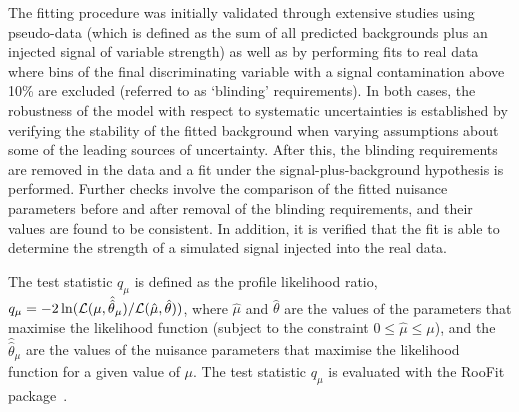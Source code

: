 The fitting procedure was initially validated through extensive studies using pseudo-data (which is defined as the sum of all predicted backgrounds 
plus an injected signal of variable strength) as well as by performing fits to real data where bins of the final discriminating variable with 
a signal contamination above 10\% are excluded (referred to as `blinding' requirements).
In both cases, the robustness of the model with respect to systematic uncertainties is established by verifying the stability of the fitted background 
when varying assumptions about some of the leading sources of uncertainty. 
After this, the blinding requirements
are removed in the data and a fit under the signal-plus-background hypothesis is performed. Further checks involve the comparison of the fitted 
nuisance parameters before and after removal of the blinding requirements, and their values are found to be consistent. In addition, it is verified that the 
fit is able to determine the strength of a simulated signal injected into the real data.

The test statistic $q_\mu$ is defined as the profile likelihood ratio, 
$q_\mu = -2\ln({\cal L}(\mu,{\hat{\hat{\theta}}}_\mu)/{\cal L}(\hat{\mu},\hat{\theta}))$,
where $\hat{\mu}$ and $\hat{\theta}$ are the values of the parameters that
maximise the likelihood function (subject to the constraint $0\leq \hat{\mu} \leq \mu$), and the ${\hat{\hat{\theta}}}_\mu$ are the values of the
nuisance parameters that maximise the likelihood function for a given value of $\mu$. 
The test statistic $q_\mu$ is evaluated with the {\textsc RooFit} package~\cite{Verkerke:2003ir,RooFitManual}.

